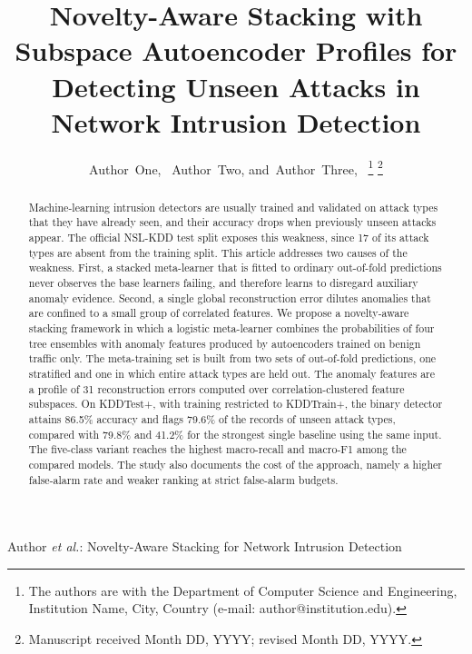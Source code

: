 \documentclass[journal]{IEEEtran}
\begin{document}
\title{Novelty-Aware Stacking with Subspace Autoencoder Profiles for Detecting Unseen Attacks in Network Intrusion Detection}

\author{Author~One,~
        Author~Two,
        and~Author~Three,~%
\thanks{The authors are with the Department of Computer Science and Engineering, Institution Name, City, Country (e-mail: author@institution.edu).}%
\thanks{Manuscript received Month DD, YYYY; revised Month DD, YYYY.}}

%
{Author \MakeLowercase{\textit{et al.}}: Novelty-Aware Stacking for Network Intrusion Detection}

\maketitle

\begin{abstract}
Machine-learning intrusion detectors are usually trained and validated on attack types that they have already seen, and their accuracy drops when previously unseen attacks appear. The official NSL-KDD test split exposes this weakness, since 17 of its attack types are absent from the training split. This article addresses two causes of the weakness. First, a stacked meta-learner that is fitted to ordinary out-of-fold predictions never observes the base learners failing, and therefore learns to disregard auxiliary anomaly evidence. Second, a single global reconstruction error dilutes anomalies that are confined to a small group of correlated features. We propose a novelty-aware stacking framework in which a logistic meta-learner combines the probabilities of four tree ensembles with anomaly features produced by autoencoders trained on benign traffic only. The meta-training set is built from two sets of out-of-fold predictions, one stratified and one in which entire attack types are held out. The anomaly features are a profile of 31 reconstruction errors computed over correlation-clustered feature subspaces. On KDDTest+, with training restricted to KDDTrain+, the binary detector attains 86.5\% accuracy and flags 79.6\% of the records of unseen attack types, compared with 79.8\% and 41.2\% for the strongest single baseline using the same input. The five-class variant reaches the highest macro-recall and macro-F1 among the compared models. The study also documents the cost of the approach, namely a higher false-alarm rate and weaker ranking at strict false-alarm budgets.
\end{abstract}
\end{document}
